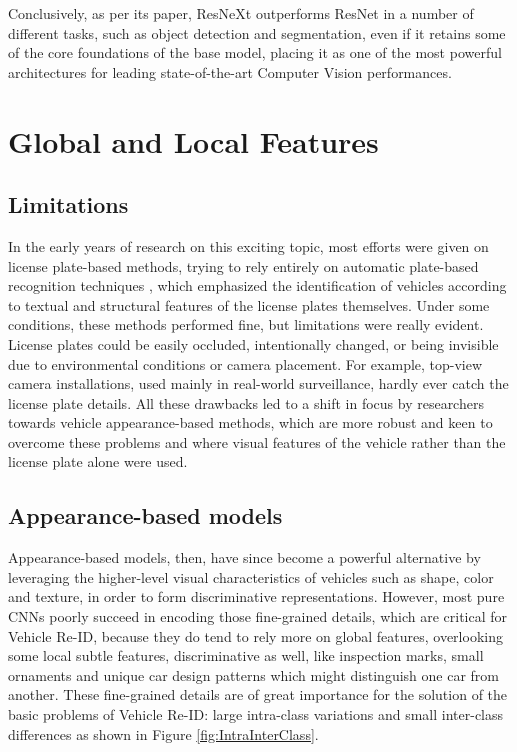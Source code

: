 Conclusively, as per its paper, ResNeXt outperforms ResNet in a number of different tasks, such as object detection and segmentation, even if it retains some of the core foundations of the base model, placing it as one of the most powerful architectures for leading state-of-the-art Computer Vision performances.

\section{Global and Local Features}
\subsection{Limitations}
In the early years of research on this exciting topic, most efforts were given on license plate-based methods, trying to rely entirely on automatic plate-based recognition techniques \cite{LicensePlate_1, LicensePlate_2}, which emphasized the identification of vehicles according to textual and structural features of the license plates themselves. Under some conditions, these methods performed fine, but limitations were really evident. License plates could be easily occluded, intentionally changed, or being invisible due to environmental conditions or camera placement. For example, top-view camera installations, used mainly in real-world surveillance, hardly ever catch the license plate details. All these drawbacks led to a shift in focus by researchers towards vehicle appearance-based methods, which are more robust and keen to overcome these problems and where visual features of the vehicle rather than the license plate alone were used.

\subsection{Appearance-based models}
Appearance-based models, then, have since become a powerful alternative by leveraging the higher-level visual characteristics of vehicles such as shape, color and texture, in order to form discriminative representations. However, most pure CNNs poorly succeed in encoding those fine-grained details, which are critical for Vehicle Re-ID, because they do tend to rely more on global features, overlooking some local subtle features, discriminative as well, like inspection marks, small ornaments and unique car design patterns which might distinguish one car from another. These fine-grained details are of great importance for the solution of the basic problems of Vehicle Re-ID: large intra-class variations and small inter-class differences as shown in Figure \ref{fig:IntraInterClass}.

